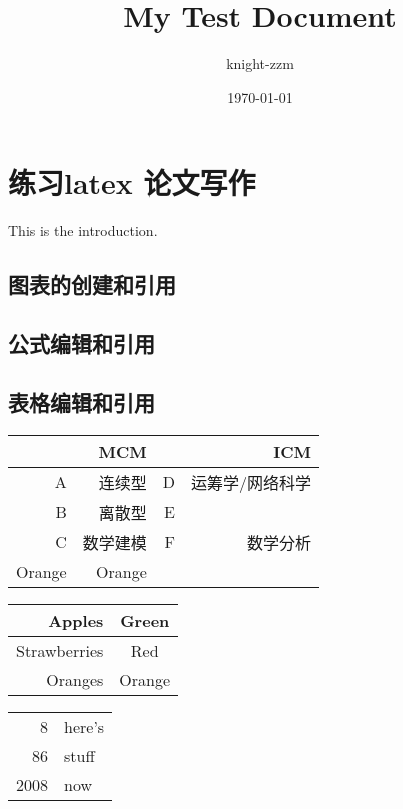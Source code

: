 \documentclass[a4paper,12pt]{article}
\begin{document}
\title{\huge My Test Document}
\author{{\large knight-zzm}}
\date{\today}
\maketitle
\thispagestyle{empty} %
\newpage

\tableofcontents
\thispagestyle{empty} %
\newpage
{}
\section{练习latex 论文写作}
This is the introduction.

\subsection{图表的创建和引用}
\subsection{公式编辑和引用}

\subsection{表格编辑和引用}
\begin{tabular}{|r|r|r|r|}
    \hline
    \multicolumn{2}{|r|}{MCM} & \multicolumn{2}{|r|}{ICM} \\
    \hline
    A & 连续型 & D & 运筹学/网络科学\\
    \hline
    B & 离散型 & E & \\
    \hline
    C & 数学建模 & F & 数学分析\\
    Orange & Orange\\
    \hline
    \end{tabular}
    
    \begin{tabular}{rc}
    Apples & Green\\
    \hline 
    Strawberries & Red \\
    \cline{1-1}
    Oranges & Orange \\
    \end{tabular}
    
    \begin{tabular}{|r|l|}
    \hline
    8 & here's \\
    \cline{2-2}
    86 & stuff\\
    \hline \hline 
    2008 & now \\
    \hline 
    \end{tabular}
\end{document}
